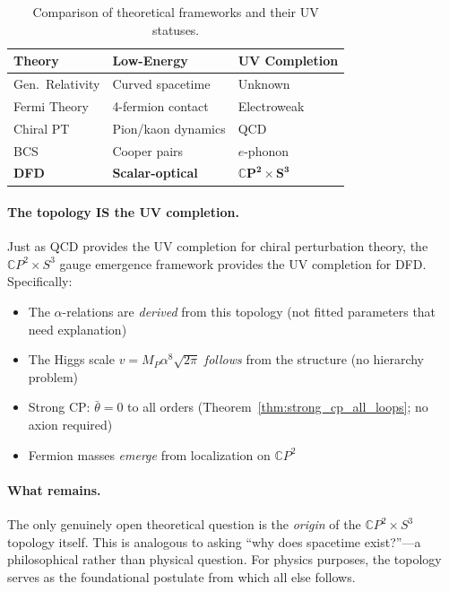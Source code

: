 \begin{table}[h]
\centering
\caption{Comparison of theoretical frameworks and their UV statuses.}\label{tab:theory-comparison}
\begin{ruledtabular}
\scriptsize
\begin{tabular}{lll}
\textbf{Theory} & \textbf{Low-Energy} & \textbf{UV Completion} \\
\hline
Gen.\ Relativity & Curved spacetime & Unknown \\
Fermi Theory & 4-fermion contact & Electroweak \\
Chiral PT & Pion/kaon dynamics & QCD \\
BCS & Cooper pairs & $e$-phonon \\
\textbf{DFD} & \textbf{Scalar-optical} & $\boldsymbol{\mathbb{C}P^2 \times S^3}$ \\
\end{tabular}
\end{ruledtabular}
\end{table}

\paragraph{The topology IS the UV completion.}
Just as QCD provides the UV completion for chiral perturbation theory, the $\mathbb{C}P^2 \times S^3$ gauge emergence framework provides the UV completion for DFD. Specifically:

\begin{itemize}
\item The $\alpha$-relations are \textit{derived} from this topology (not fitted parameters that need explanation)
\item The Higgs scale $v = M_P \alpha^8 \sqrt{2\pi}$ \textit{follows} from the structure (no hierarchy problem)
\item Strong CP: $\bar{\theta} = 0$ to all orders (Theorem~\ref{thm:strong_cp_all_loops}; no axion required)
\item Fermion masses \textit{emerge} from localization on $\mathbb{C}P^2$
\end{itemize}

\paragraph{What remains.}
The only genuinely open theoretical question is the \textit{origin} of the $\mathbb{C}P^2 \times S^3$ topology itself. This is analogous to asking ``why does spacetime exist?''---a philosophical rather than physical question. For physics purposes, the topology serves as the foundational postulate from which all else follows.

